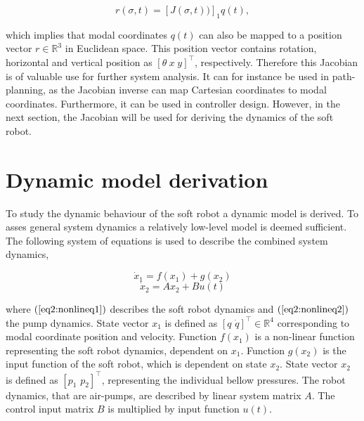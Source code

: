 \begin{equation}
    r(\sigma,t) = [J(\sigma,t))]_1q(t),
\end{equation}

which implies that modal coordinates $q(t)$ can also be mapped to a position vector $r\in \mathbb{R}^3$ in Euclidean space. This position vector contains rotation, horizontal and vertical position as $[\theta \hspace{3pt} x \hspace{3pt} y]^\top$, respectively. Therefore this Jacobian is of valuable use for further system analysis. It can for instance be used in path-planning, as the Jacobian inverse can map Cartesian coordinates to modal coordinates. Furthermore, it can be used in controller design. However, in the next section, the Jacobian will be used for deriving the dynamics of the soft robot. 


\section{Dynamic model derivation}


To study the dynamic behaviour of the soft robot a dynamic model is derived. To asses general system dynamics a relatively low-level model is deemed sufficient. The following system of equations is used to describe the combined system dynamics,


\begin{equation}
    \dot{x}_1  = f(x_1) + g(x_2) 
       \label{eq2:nonlineq1}
    \end{equation}
    \begin{equation}
    \dot{x}_2 = Ax_2 + Bu(t)  
    \label{eq2:nonlineq2}
\end{equation}

where $(\ref{eq2:nonlineq1})$ describes the soft robot dynamics and $(\ref{eq2:nonlineq2})$ the pump dynamics. State vector $x_1$ is defined as $[ q \hspace{4pt} \dot{q} ]^\top \in \mathbb{R}^4$ corresponding to modal coordinate position and velocity. Function $f(x_1)$ is a non-linear function representing the soft robot dynamics, dependent on $x_1$. Function $g(x_2)$ is the input function of the soft robot, which is dependent on state $x_2$. State vector $x_2$ is defined as $[ p_1 \hspace{4pt} p_2 ]^\top$, representing the individual bellow pressures. The robot dynamics, that are air-pumps, are described by linear system matrix $A$. The control input matrix $B$ is multiplied by input function $u(t)$.

